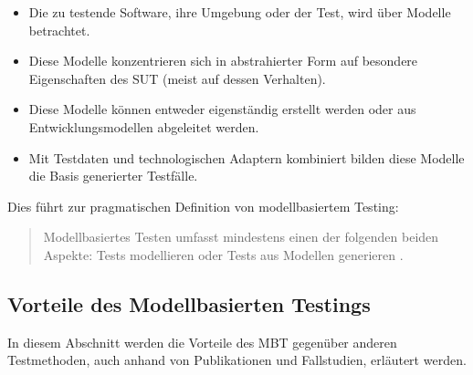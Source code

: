 \begin{itemize}
\item Die zu testende Software, ihre Umgebung oder der Test, wird über Modelle betrachtet.
\item Diese Modelle konzentrieren sich in abstrahierter Form auf besondere Eigenschaften des \Gls{SUT} (meist auf dessen Verhalten).
\item Diese Modelle können entweder eigenständig erstellt werden oder aus Entwicklungsmodellen abgeleitet werden.
\item Mit Testdaten und technologischen Adaptern kombiniert bilden diese Modelle die Basis generierter Testfälle.
\end{itemize}

Dies führt zur pragmatischen Definition von modellbasiertem Testing:

\begin{quote}
Modellbasiertes Testen umfasst mindestens einen der folgenden beiden Aspekte: Tests modellieren oder Tests aus Modellen generieren \cite{rossner_basiswissen_2010}.
\end{quote}

\subsection{Vorteile des Modellbasierten Testings}
\label{sec:mbt_vorteile}
In diesem Abschnitt werden die Vorteile des \Gls{MBT} gegenüber anderen Testmethoden, auch anhand von Publikationen und Fallstudien, erläutert werden.


